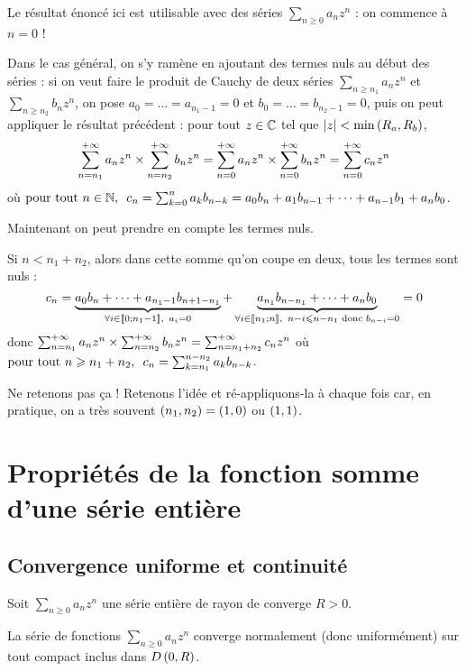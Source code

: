 \begin{rem}
Le résultat énoncé ici est utilisable avec des séries \(\sum_{n\geq0}a_nz^n\) : on commence à \(n=0\) !

Dans le cas général, on s'y ramène en ajoutant des termes nuls au début des séries : si on veut faire le produit de Cauchy de deux séries \(\sum_{n\geq n_1}a_nz^n\) et \(\sum_{n\geq n_2}b_nz^n\), on pose \(a_0=\dots=a_{n_1-1}=0\) et \(b_0=\dots=b_{n_2-1}=0\), puis on peut appliquer le résultat précédent : pour tout \(z\in\mathbb{C}\) tel que \(\left\lvert z\right\rvert<\min\left(R_a,R_b\right)\), \[\sum_{n=n_1}^{+\infty}a_nz^n\times\sum_{n=n_2}^{+\infty}b_nz^n=\sum_{n=0}^{+\infty}a_nz^n\times\sum_{n=0}^{+\infty}b_nz^n=\sum_{n=0}^{+\infty}c_nz^n\] où \(\quantifs{\tpt n\in\N}c_n=\sum_{k=0}^na_kb_{n-k}=a_0b_n+a_1b_{n-1}+\dots+a_{n-1}b_1+a_nb_0\).

Maintenant on peut prendre en compte les termes nuls.

Si \(n<n_1+n_2\), alors dans cette somme qu'on coupe en deux, tous les termes sont nuls : \[c_n=\underbrace{a_0b_n+\dots+a_{n_1-1}b_{n+1-n_1}}_{\quantifs{\forall i\in\interventierii{0}{n_1-1}}a_i=0}+\underbrace{a_{n_1}b_{n-n_1}+\dots+a_nb_0}_{\quantifs{\forall i\in\interventierii{n_1}{n}}n-i\leq n-n_1\text{ donc }b_{n-i}=0}=0\] donc \(\sum_{n=n_1}^{+\infty}a_nz^n\times\sum_{n=n_2}^{+\infty}b_nz^n=\sum_{n=n_1+n_2}^{+\infty}c_nz^n\) où \(\quantifs{\tpt n\geq n_1+n_2}c_n=\sum_{k=n_1}^{n-n_2}a_kb_{n-k}\).

Ne retenons pas ça ! Retenons l'idée et ré-appliquons-la à chaque fois car, en pratique, on a très souvent \(\left(n_1,n_2\right)=\left(1,0\right)\) ou \(\left(1,1\right)\).
\end{rem}

\section{Propriétés de la fonction somme d'une série entière}

\subsection{Convergence uniforme et continuité}

\begin{theo}
Soit \(\sum_{n\geq0}a_nz^n\) une série entière de rayon de converge \(R>0\).

La série de fonctions \(\sum_{n\geq0}a_nz^n\) converge normalement (donc uniformément) sur tout compact inclus dans \(D\left(0,R\right)\).
\end{theo}

